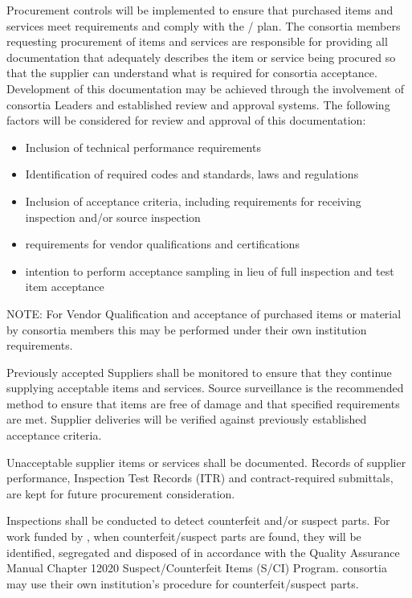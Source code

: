 Procurement controls will be implemented to ensure that purchased
items and services meet  requirements and comply with the
/  plan.  The consortia members requesting
procurement of items and services are responsible for providing all
documentation that adequately describes the item or service being
procured so that the supplier can understand what is required for
consortia acceptance. Development of this documentation may be
achieved through the involvement of consortia Leaders and established
review and approval systems. The following factors will be considered
for review and approval of this documentation:
\begin{itemize}
 \item Inclusion of technical performance requirements
 \item Identification of required codes and standards, laws and regulations
 \item Inclusion of acceptance criteria, including requirements for
   receiving inspection and/or source inspection
 \item {} requirements for vendor qualifications and certifications
 \item {} intention to perform acceptance sampling in lieu
   of full inspection and test item acceptance
\end{itemize}
NOTE: For Vendor Qualification and acceptance of purchased items or
material by consortia members this may be performed under their own
institution requirements.

Previously accepted Suppliers shall be monitored to ensure that they
continue supplying acceptable items and services. Source surveillance
is the recommended method to ensure that items are free of damage and
that specified requirements are met. Supplier deliveries will be
verified against previously established acceptance criteria.

Unacceptable supplier items or services shall be documented. Records
of supplier performance, Inspection Test Records (ITR) and
contract-required submittals, are kept for future procurement
consideration.

Inspections shall be conducted to detect counterfeit and/or suspect
parts. For work funded by , when counterfeit/suspect parts are
found, they will be identified, segregated and disposed of in
accordance with the \fnal Quality Assurance Manual Chapter 12020
Suspect/Counterfeit Items (S/CI) Program.  consortia may use their
own institution’s procedure for counterfeit/suspect parts.

